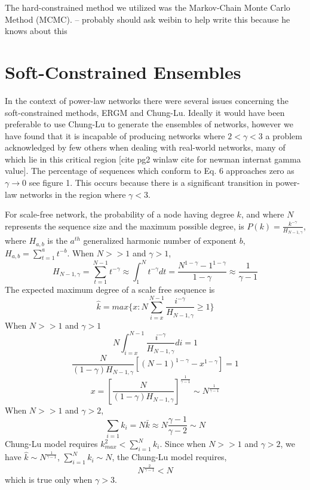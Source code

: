 \documentclass[aip,graphicx,amsmath]{revtex4-1}
\begin{document}
	The hard-constrained method we utilized was the Markov-Chain Monte Carlo Method (MCMC).
-- probably should ask weibin to help write this because he knows about this

\section{Soft-Constrained Ensembles}
	In the context of power-law networks there were several issues concerning the soft-constrained methods, ERGM and Chung-Lu. Ideally it would have been preferable to use Chung-Lu to generate the ensembles of networks, however we have found that it is incapable of producing networks where $2<\gamma<3$ a problem acknowledged by few others when dealing with real-world networks, many of which lie in this critical region [cite pg2 winlaw cite for newman internat gamma value]. The percentage of sequences which conform to Eq. 6 approaches zero as $\gamma \to 0$ see figure 1. This occurs because there is a significant transition in power-law networks in the region where $\gamma < 3$.
	
	For scale-free network, the probability of a node having degree $k$, and where $N$ represents the sequence size and the maximum possible degree, is $P(k)=\frac{k^{-\gamma}}{H_{N-1,\gamma}}$, where $H_{a,b}$ is the $a^{th}$ generalized harmonic number of exponent $b$, $H_{a,b}=\sum_{t=1}^a t^{-b}$. When $N>>1$ and $\gamma > 1$,
\begin{equation}
H_{N-1,\gamma}=\sum_{t=1}^{N-1}t^{-\gamma} \approx \int_{1}^{N} t^{-\gamma} dt = \frac{N^{1-\gamma}-1^{1-\gamma}}{1-\gamma} \approx \frac{1}{\gamma-1}
\end{equation}
The expected maximum degree of a scale free sequence is \cite{ScaleFreeSparse}
\begin{equation}
\hat{k}=max\{x: N\sum_{i=x}^{N-1}\frac{i^{-\gamma}}{H_{N-1,\gamma}} \geq 1\}
\end{equation}
When $N>>1$ and $\gamma>1$
\begin{equation}
N\int_{i=x}^{N-1}\frac{i^{-\gamma}}{H_{N-1,\gamma}} di =1
\end{equation}
\begin{equation}
\frac{N}{(1-\gamma)H_{N-1,\gamma}}[(N-1)^{1-\gamma}-x^{1-\gamma}]=1
\end{equation}
\begin{equation}
x=[\frac{N}{(1-\gamma)H_{N-1,\gamma}}]^{\frac{1}{\gamma-1}} \sim N^{\frac{1}{\gamma-1}}
\end{equation}
When $N>>1$ and $\gamma>2$,
\begin{equation}
\sum_{i=1} k_i = N \bar{k} \approx N \frac{\gamma-1}{\gamma-2} \sim N
\end{equation}
Chung-Lu model requires $k_{max}^2 < \sum_{i=1}^N k_i$. 
Since when $N>>1$ and $\gamma>2$, we have $\hat{k} \sim N^{ \frac{1}{\gamma-1}}$, $\sum_{i=1}^{N} k_i \sim N$, the Chung-Lu model requires,
\begin{equation}
N^{\frac{2}{\gamma-1}} < N
\end{equation}
which is true only when $\gamma > 3$.
\end{document}
